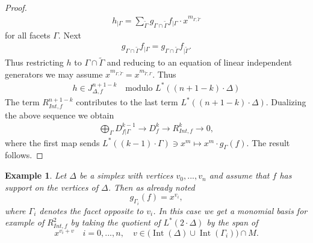\documentclass[12pt, english]{article}
\newtheorem{example}[definition]{Example}
\DeclareMathOperator{\Int}{Int}
\begin{document}
\begin{proof}
	\begin{align*}
		h_{\vert{\Gamma}} = \sum\limits_{\tilde{\Gamma}} g_{\Gamma \cap \tilde{\Gamma}} f_{\vert{\Gamma}} \cdot x^{m_{\Gamma,\tilde{\Gamma}}}
	\end{align*}
	for all facets $\Gamma$. Next
	\begin{align*}
		g_{\Gamma \cap \tilde{\Gamma}} f_{\vert{\Gamma}} = g_{\Gamma \cap \tilde{\Gamma}} f_{\vert{\tilde{\Gamma}}}.
	\end{align*}
	Thus restricting $h$ to $\Gamma \cap \tilde{\Gamma}$ and reducing to an equation of linear independent generators we may assume $x^{m_{\Gamma,\tilde{\Gamma}}} = x^{m_{\tilde{\Gamma},\Gamma}}$. Thus 
	\begin{align*}
		h \in J_{\Delta,f}^{n+1-k} \quad \textrm{modulo } L^*((n+1-k) \cdot \Delta)
	\end{align*}
	The term $R_{Int,f}^{n+1-k}$ contributes to the last term $L^*((n+1-k) \cdot \Delta)$. Dualizing the above sequence we obtain
	\begin{align*}
		\bigoplus\limits_{\Gamma} D_{f \vert{\Gamma}}^{k-1} \rightarrow D_f^{k} \rightarrow R_{Int,f}^{k} \rightarrow 0,
	\end{align*}
	where the first map sends $L^*((k-1) \cdot \Gamma) \ni x^m \mapsto x^m \cdot g_{\Gamma}(f)$. The result follows.
	
	
\end{proof}


\begin{example} \label{example_f_support_vertices_of_simplex_jacobian_ring}
	\normalfont
	Let $\Delta$ be a simplex with vertices $v_0,...,v_n$ and assume that $f$ has support on the vertices of $\Delta$. Then as already noted
	\[  g_{\Gamma_i}(f) = x^{v_i}, \] 
	where $\Gamma_i$ denotes the facet opposite to $v_i$. In this case we get a \textit{monomial} basis for example of $R_{Int,f}^2$ by taking the quotient of $L^*(2 \cdot \Delta)$ by the span of 
	\[ x^{v_i + v} \quad i=0,...,n, \quad  v \in \big( \Int(\Delta) \cup \Int(\Gamma_i) \big) \cap M.  \]
\end{example}
\end{document}
